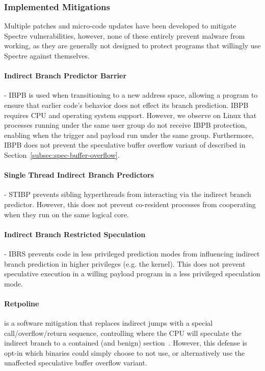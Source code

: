 \subsubsection{Implemented Mitigations}
Multiple patches and micro-code updates have been developed to mitigate Spectre
vulnerabilities, however, none of these entirely prevent \speculake malware from
working, as they are generally not designed to protect programs that willingly
use Spectre against themselves.

\paragraph{Indirect Branch Predictor Barrier} - IBPB is used when transitioning to a new
address space, allowing a
program to ensure that earlier code's behavior does not effect its branch prediction.
IBPB requires CPU and operating system support. However, we observe on Linux that
processes running under the same user group do not receive IBPB protection,
enabling \speculake when the trigger and payload run under the same group.
Furthermore, IBPB does not prevent the speculative buffer overflow variant of
\speculake described in Section~\ref{subsec:spec-buffer-overflow}.


\paragraph{Single Thread Indirect Branch Predictors} - STIBP prevents sibling
hyperthreads from interacting via the indirect branch predictor. However, this
does not prevent co-resident processes from cooperating when they run on the same
logical core.

\paragraph{Indirect Branch Restricted Speculation} - IBRS prevents code in less
privileged prediction modes from influencing indirect branch prediction in
higher privileges (e.g. the kernel). This does not
prevent speculative execution in a willing payload program in a less privileged
speculation mode.

\paragraph{Retpoline} is a software mitigation that replaces indirect jumps with
a special call/overflow/return sequence, controlling where the CPU will
speculate the indirect branch to a contained (and benign)
section~\cite{retpoline}. However, this defense is opt-in which \speculake
binaries could simply choose to not use, or alternatively use the unaffected
speculative buffer overflow variant.

